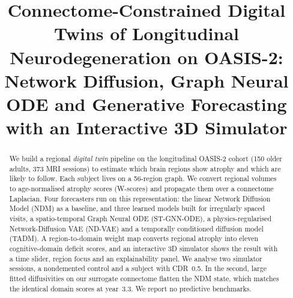 \documentclass[conference]{IEEEtran}
\begin{document}
\title{Connectome-Constrained Digital Twins of Longitudinal Neurodegeneration on OASIS-2: Network Diffusion, Graph Neural ODE and Generative Forecasting with an Interactive 3D Simulator}

\author{
\and
{}
\and
{}
}

\maketitle

\begin{abstract}
We build a regional \emph{digital twin} pipeline on the longitudinal OASIS-2 cohort (150 older adults, 373 MRI sessions) to estimate which brain regions show atrophy and which are likely to follow. Each subject lives on a 56-region graph. We convert regional volumes to age-normalised atrophy scores (W-scores) and propagate them over a connectome Laplacian. Four forecasters run on this representation: the linear Network Diffusion Model (NDM) as a baseline, and three learned models built for irregularly spaced visits, a spatio-temporal Graph Neural ODE (ST-GNN-ODE), a physics-regularised Network-Diffusion VAE (ND-VAE) and a temporally conditioned diffusion model (TADM). A region-to-domain weight map converts regional atrophy into eleven cognitive-domain deficit scores, and an interactive 3D simulator shows the result with a time slider, region focus and an explainability panel. We analyse two simulator sessions, a nondemented control and a subject with CDR~0.5. In the second, large fitted diffusivities on our surrogate connectome flatten the NDM state, which matches the identical domain scores at year~3.3. We report no predictive benchmarks.
\end{abstract}
\end{document}
